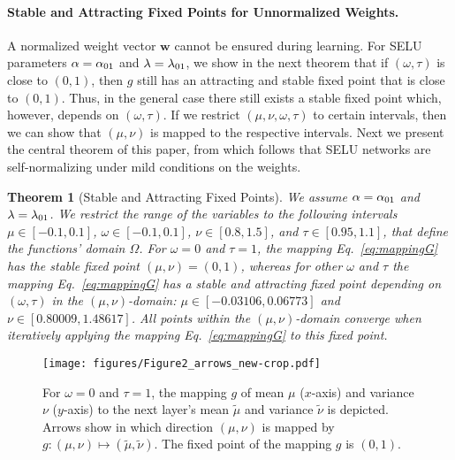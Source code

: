 \documentclass{article}
\newtheorem{theorem}{Theorem}
\newcommand\Bw{\bm{w}}
\newcommand\munn{{\tilde \mu}}
\newcommand\nunn{{\tilde \nu}}
\begin{document}
\paragraph{Stable and Attracting Fixed Points for Unnormalized Weights.}
A normalized weight vector $\Bw$ cannot be ensured during learning.
For SELU parameters 
$\alpha = \alpha_{\rm 01}$ and $\lambda=\lambda_{\rm 01}$,
we show in the next theorem that 
if $(\omega,\tau)$ is close to $(0,1)$, then $g$ still has an
attracting and stable fixed point
that is close to $(0,1)$.
Thus, in the general case there still exists a stable fixed point
which, however, depends on $(\omega,\tau)$.
If we restrict $(\mu,\nu,\omega,\tau)$ to certain intervals, then we 
can show that $(\mu,\nu)$ is mapped to the respective intervals.
Next we present the central theorem of this paper,
from which follows that SELU
networks are self-normalizing under mild conditions on the weights.
\begin{theorem}[Stable and Attracting Fixed Points]
\label{lem:fixedPoint} 
We assume $\alpha = \alpha_{\rm 01}$ and $\lambda=\lambda_{\rm 01}$.
We restrict the range of the variables to the following intervals
$\mu \in [-0.1,0.1]$,
$\omega \in [-0.1,0.1]$,
$\nu \in [0.8,1.5]$, and
$\tau \in [0.95,1.1]$, 
that define the functions' domain $\Omega$.
For $\omega=0$ and $\tau=1$, the mapping  Eq.~\eqref{eq:mappingG}
 has the stable
fixed point $(\mu,\nu)=(0,1)$, whereas for other $\omega$ and $\tau$ the mapping  Eq.~\eqref{eq:mappingG}
 has a stable and
attracting fixed point depending on $(\omega,\tau)$ in the 
$(\mu,\nu)$-domain: $\mu \in [-0.03106, 0.06773]$ and 
$\nu \in [0.80009,1.48617]$.
All points within the $(\mu,\nu)$-domain converge when
iteratively applying the mapping  Eq.~\eqref{eq:mappingG} to this fixed point.
\end{theorem}


\begin{figure}
 \texttt{[image: figures/Figure2\_arrows\_new-crop.pdf]}
 \caption[Visualization of the mapping $g$]{For $\omega=0$ and $\tau=1$, 
  the mapping $g$ of mean $\mu$ ($x$-axis) and variance $\nu$ ($y$-axis)
  to the next layer's mean $\munn$ and variance $\nunn$ 
  is depicted.
  Arrows show in which direction $(\mu,\nu)$ is mapped by $g:(\mu,\nu) \mapsto (\munn, \nunn)$.
  The fixed point of the mapping $g$ is $(0,1)$.
 \label{fig:arrows}}
\end{figure}
\end{document}

